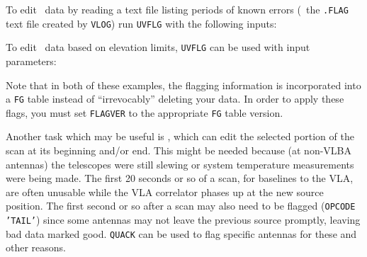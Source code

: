To edit \uv\ data by reading a text file listing periods of known
errors (\eg\ the {\tt .FLAG} text file created by {\tt VLOG}) run
{\tt UVFLG} with the following inputs:

To edit \uv\ data based on elevation limits, {\tt UVFLG} can be used
with input parameters:

Note that in both of these examples, the flagging information is
incorporated into a {\tt FG} table instead of ``irrevocably'' deleting
your data.  In order to apply these flags, you must set {\tt FLAGVER}
to the appropriate {\tt FG} table version.

Another  task which may be useful is {\tt {}},
which can edit the selected portion of the scan at its beginning
and/or end.  This might be needed because (at non-VLBA antennas) the
telescopes were still slewing or system temperature measurements were
being made.  The first 20 seconds or so of a scan, for baselines to
the VLA, are often unusable while the VLA correlator phases up at the
new source position.  The first second or so after a scan may also
need to be flagged ({\tt OPCODE 'TAIL'}) since some antennas may not
leave the previous source promptly, leaving bad data marked good.
{\tt QUACK} can be used to flag specific antennas for these and other
reasons.

